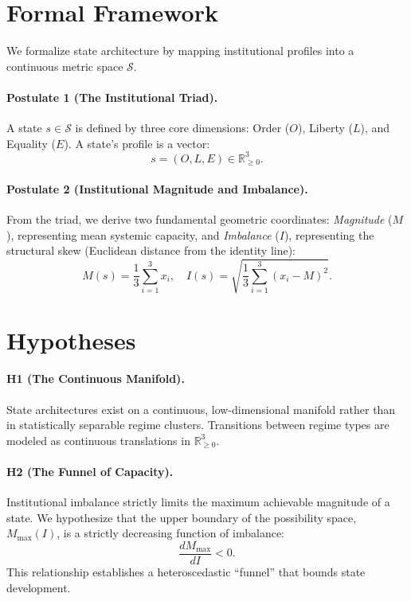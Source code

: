 \documentclass[12pt]{article}
\begin{document}
\section{Formal Framework}

We formalize state architecture by mapping institutional profiles into a continuous metric space $\mathcal{S}$.

\paragraph{Postulate 1 (The Institutional Triad).}
A state $s \in \mathcal{S}$ is defined by three core dimensions: Order ($O$), Liberty ($L$), and Equality ($E$). A state's profile is a vector:
\begin{equation}
    s = (O, L, E) \in \mathbb{R}^3_{\ge 0}.
\end{equation}

\paragraph{Postulate 2 (Institutional Magnitude and Imbalance).}
From the triad, we derive two fundamental geometric coordinates: \textit{Magnitude} ($M$), representing mean systemic capacity, and \textit{Imbalance} ($I$), representing the structural skew (Euclidean distance from the identity line):
\begin{equation}
    M(s) = \frac{1}{3} \sum_{i=1}^{3} x_i, \quad I(s) = \sqrt{\frac{1}{3} \sum_{i=1}^{3} (x_i - M)^2}.
\end{equation}

\section{Hypotheses}

\paragraph{H1 (The Continuous Manifold).}
State architectures exist on a continuous, low-dimensional manifold rather than in statistically separable regime clusters. Transitions between regime types are modeled as continuous translations in $\mathbb{R}^3_{\ge 0}$.

\paragraph{H2 (The Funnel of Capacity).}
Institutional imbalance strictly limits the maximum achievable magnitude of a state. We hypothesize that the upper boundary of the possibility space, $M_{\max}(I)$, is a strictly decreasing function of imbalance:
\begin{equation}
    \frac{d M_{\max}}{d I} < 0.
\end{equation}
This relationship establishes a heteroscedastic ``funnel'' that bounds state development.
\end{document}
